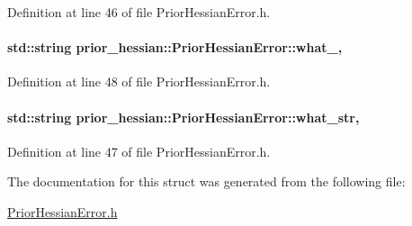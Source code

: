 Definition at line 46 of file Prior\+Hessian\+Error.\+h.

\paragraph[{\texorpdfstring{what\+\_\+}{what_}}]{\setlength{\rightskip}{0pt plus 5cm}std\+::string prior\+\_\+hessian\+::\+Prior\+Hessian\+Error\+::what\+\_\+\hspace{0.3cm}{\ttfamily [protected]}, {\ttfamily [inherited]}}\hypertarget{classprior__hessian_1_1PriorHessianError_a018e11b5863c2a3a06d37a16a89b14b2}{}\label{classprior__hessian_1_1PriorHessianError_a018e11b5863c2a3a06d37a16a89b14b2}


Definition at line 48 of file Prior\+Hessian\+Error.\+h.

\paragraph[{\texorpdfstring{what\+\_\+str}{what_str}}]{\setlength{\rightskip}{0pt plus 5cm}std\+::string prior\+\_\+hessian\+::\+Prior\+Hessian\+Error\+::what\+\_\+str\hspace{0.3cm}{\ttfamily [protected]}, {\ttfamily [inherited]}}\hypertarget{classprior__hessian_1_1PriorHessianError_a0d97e1b6b1bcf6a440400706f416375e}{}\label{classprior__hessian_1_1PriorHessianError_a0d97e1b6b1bcf6a440400706f416375e}


Definition at line 47 of file Prior\+Hessian\+Error.\+h.



The documentation for this struct was generated from the following file\+:\begin{DoxyCompactItemize}
\item 
\hyperlink{PriorHessianError_8h}{Prior\+Hessian\+Error.\+h}\end{DoxyCompactItemize}
